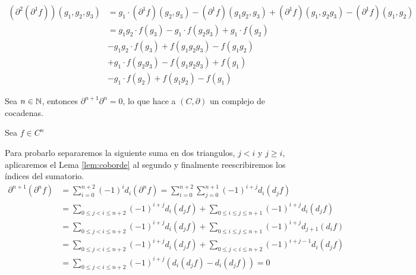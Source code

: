 \begin{lema}
\begin{demostracion}
		\begin{align*}
			(\partial^2(\partial^1f))(g_1,g_2,g_3) 
			& = g_1\cdot (\partial^1f)(g_2,g_3) - (\partial^1f)(g_1g_2,g_3) + (\partial^1f)(g_1,g_2g_3) - (\partial^1f)(g_1,g_2) \\
			& = g_1g_2\cdot f(g_3) - g_1\cdot f(g_2g_3) + g_1\cdot f(g_2) \\
			& - g_1g_2\cdot f(g_3) + f(g_1g_2g_3) - f(g_1g_2) \\
			& + g_1\cdot f(g_2g_3) - f(g_1g_2g_3) + f(g_1) \\
			& - g_1\cdot f(g_2) + f(g_1g_2) - f(g_1)
		\end{align*}
	\end{demostracion}
\end{lema}

\begin{teorema}\label{prop:cochaincomplex}
	Sea $n\in \mathbb{N}$, entonces $\partial^{n+1}\partial^n = 0$, lo que hace a
	$(C,\partial)$ un complejo de cocadenas.
	\begin{demostracion}
		Sea $f\in C^n$ %
		
		Para probarlo separaremos la siguiente suma en dos triangulos,  $j<i$ y $j\geq i$, aplicaremos el Lema \ref{lem:coborde} al segundo y finalmente reescribiremos los índices del sumatorio.
		\begin{align*}
		\partial^{n+1}(\partial^{n} f) 
			&= \sum_{i=0}^{n+2} (-1)^i d_i(\partial^n f) = \sum_{i=0}^{n+2}\sum_{j=0}^{n+1} (-1)^{i+j} d_i(d_jf)\\
			&= \sum_{0\leq j < i \leq n+2} (-1)^{i+j} d_i(d_jf)  + \sum_{0\leq i \leq j \leq n+1} (-1)^{i+j} d_i(d_jf)\\
			&= \sum_{0\leq j < i \leq n+2} (-1)^{i+j} d_i(d_jf)  + \sum_{0\leq i \leq j \leq n+1} (-1)^{i+j} d_{j+1}(d_if) \\
			&= \sum_{0\leq j < i \leq n+2} (-1)^{i+j} d_i(d_jf)  + \sum_{0\leq j < i \leq n+2} (-1)^{i+j-1} d_{i}(d_jf) \\
			&= \sum_{0\leq j < i \leq n+2} (-1)^{i+j}(d_i(d_jf)-d_i(d_jf)) = 0
		\end{align*}
	\end{demostracion}
\end{teorema}

